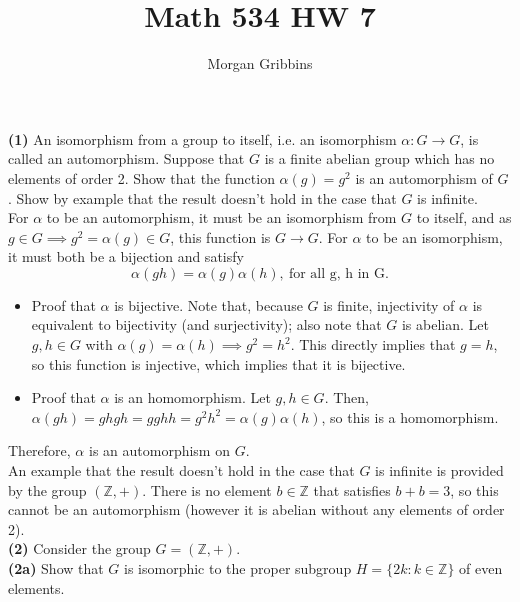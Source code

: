 \documentclass[12pt,letterpaper]{article}
\title{Math 534 HW 7}
\author{Morgan Gribbins}
\date{}
\begin{document}
	
\maketitle

\textbf{(1)} An isomorphism from a group to itself, i.e. an isomorphism \(\alpha: G \to G\), is called an automorphism. Suppose that \(G\) is a finite abelian group which has no elements of order 2. Show that the function \(\alpha(g) = g^{2}\) is an automorphism of \(G\). Show by example that the result doesn't hold in the case that \(G\) is infinite. \\

For \(\alpha\) to be an automorphism, it must be an isomorphism from \(G\) to itself, and as \(g \in G \implies g^{2} = \alpha(g) \in G\), this function is \(G \to G\). For \(\alpha\) to be an isomorphism, it must both be a bijection and satisfy \[\alpha(gh) = \alpha(g)\alpha(h),\ \text{for all g, h in G}.\] 

\begin{itemize}
	\item Proof that \(\alpha\) is bijective. Note that, because \(G\) is finite, injectivity of \(\alpha\) is equivalent to bijectivity (and surjectivity); also note that \(G\) is abelian. Let \(g, h \in G\) with \(\alpha(g) = \alpha(h) \implies g^{2} = h^{2}\). This directly implies that \(g = h\), so this function is injective, which implies that it is bijective. \\
	\item Proof that \(\alpha\) is an homomorphism. Let \(g,h \in G\). Then, \(\alpha(gh) = ghgh = gghh = g^{2} h^{2} = \alpha(g)\alpha(h)\), so this is a homomorphism. \\
\end{itemize}

Therefore, \(\alpha\) is an automorphism on \(G\). \\

An example that the result doesn't hold in the case that \(G\) is infinite is provided by the group \((\mathbb{Z}, +)\). There is no element \(b \in \mathbb{Z}\) that satisfies \(b + b = 3\), so this cannot be an automorphism (however it is abelian without any elements of order 2). \\ 

\textbf{(2)} Consider the group \(G = (\mathbb{Z}, +)\). \\

\textbf{(2a)} Show that \(G\) is isomorphic to the proper subgroup \(H = \{2k : k \in \mathbb{Z}\}\) of even elements. \\
\end{document}
